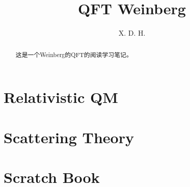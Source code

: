 \documentclass[12pt]{report}
\begin{document}
\title{\boldmath QFT Weinberg}
\author{X. D. H.}

\maketitle

\begin{abstract}
这是一个Weinberg的QFT的阅读学习笔记。
\end{abstract} 

\tableofcontents

\chapter{Relativistic QM}


\chapter{Scattering Theory}


\chapter{Scratch Book}
  
\end{document}

